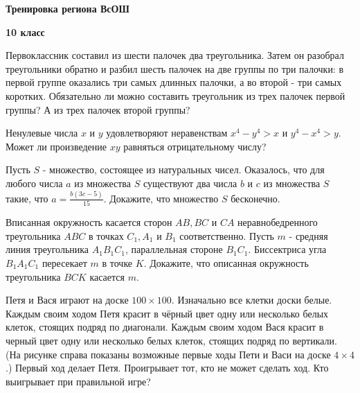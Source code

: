 \centerline{\bf \Huge Тренировка региона ВсОШ}
\centerline{\bf \Huge 10 класс}

Первоклассник составил из шести палочек два треугольника. Затем он разобрал треугольники обратно и разбил шесть палочек на две группы по три палочки: в первой группе оказались три самых длинных палочки, а во второй - три самых коротких. Обязательно ли можно составить треугольник из трех палочек первой группы? А из трех палочек второй группы?

Ненулевые числа $x$ и $y$ удовлетворяют неравенствам $x^4-y^4>x$ и $y^4-x^4>y$. Может ли произведение $x y$ равняться отрицательному числу?

Пусть $S$ - множество, состоящее из натуральных чисел. Оказалось, что для любого числа $a$ из множества $S$ существуют два числа $b$ и $c$ из множества $S$ такие, что $a=\frac{b(3 c-5)}{15}$. Докажите, что множество $S$ бесконечно.

Вписанная окружность касается сторон $A B, B C$ и $C A$ неравнобедренного треугольника $A B C$ в точках $C_1, A_1$ и $B_1$ соответственно. Пусть $m$ - средняя линия треугольника $A_1 B_1 C_1$, параллельная стороне $B_1 C_1$. Биссектриса угла $B_1 A_1 C_1$ пересекает $m$ в точке $K$. Докажите, что описанная окружность треугольника $B C K$ касается $m$.

Петя и Вася играют на доске $100 \times 100$. Изначально все клетки доски белые. Каждым своим ходом Петя красит в чёрный цвет одну или несколько белых клеток, стоящих подряд по диагонали. Каждым своим ходом Вася красит в черный цвет одну или несколько белых клеток, стоящих подряд по вертикали. (На рисунке справа показаны возможные первые ходы Пети и Васи на доске $4 \times 4$.) Первый ход делает Петя. Проигрывает тот, кто не может сделать ход. Кто выигрывает при правильной игре?